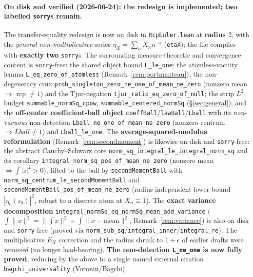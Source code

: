 \documentclass[11pt,a4paper]{article}
\theoremstyle{definition}
\newcommand{\etaX}{\eta_X}
\newcommand{\rcp}{\operatorname{rcp}}
\begin{document}
\paragraph{On disk and verified (2026-06-24): the redesign is implemented; two labelled
\texttt{sorry}s remain.} The transfer-equality redesign is now on disk in \texttt{RcpEuler.lean}
at \textbf{radius \(2\)}, with the \emph{general non-multiplicative} series
\(\etaX=\sum_n X_n n^{-s}\) (\texttt{etaX}); the file compiles with \textbf{exactly two}
\texttt{sorry}s. The surrounding measure-theoretic and convergence content is \texttt{sorry}-free:
the shared object bound \texttt{L\_le\_one}; the atomless-vacuity lemma
\texttt{L\_eq\_zero\_of\_atomless} (Remark~\ref{rem:portmanteau}); the non-degeneracy crux
\texttt{prob\_singleton\_zero\_ne\_one\_of\_mean\_ne\_zero} (nonzero mean \(\Rightarrow\rcp\neq1\))
and the Tjur-negation \texttt{tjur\_ratio\_eq\_zero\_of\_null}; the strip \(L^2\) budget
\texttt{summable\_normSq\_cpow}, \texttt{summable\_centered\_normSq} (\S\ref{sec:general}); and the
\textbf{off-center coefficient-ball object} \texttt{coeffBall}/\texttt{lawBall}/\texttt{Lball} with
its \emph{non-vacuous} non-detection \texttt{Lball\_ne\_one\_of\_mean\_ne\_zero} (nonzero centrum
\(\Rightarrow Lball\neq1\)) and \texttt{Lball\_le\_one}. The \textbf{average-squared-modulus
reformulation} (Remark~\ref{rem:secondmoment}) is likewise on disk and \texttt{sorry}-free: the
abstract Cauchy--Schwarz core \texttt{norm\_sq\_integral\_le\_integral\_norm\_sq} and its corollary
\texttt{integral\_norm\_sq\_pos\_of\_mean\_ne\_zero} (nonzero mean \(\Rightarrow\int|z|^2>0\)),
lifted to the ball by \texttt{secondMomentBall} with
\texttt{norm\_sq\_centrum\_le\_secondMomentBall} and
\texttt{secondMomentBall\_pos\_of\_mean\_ne\_zero} (radius-independent lower bound
\(|\eta_c(s_0)|^2\), robust to a discrete atom at \(X_n\equiv1\)). The \textbf{exact variance
decomposition} \texttt{integral\_normSq\_eq\_normSq\_mean\_add\_variance}
(\(\int\|x\|^2=\|\!\int x\|^2+\int\|x-\text{mean}\|^2\), Remark~\ref{rem:variance}) is also on disk and
\texttt{sorry}-free (proved via \texttt{norm\_sub\_sq}/\texttt{integral\_inner}/\texttt{integral\_re}).
The multiplicative \(E_X\)
correction and the radius shrink to \(1+\epsilon\) of earlier drafts were \emph{removed} (no longer
load-bearing).
\textbf{The non-detection \texttt{L\_ne\_one} is now fully proved}, reducing by the above to a
single named external citation \texttt{bagchi\_universality} (Voronin/Bagchi).
\end{document}
